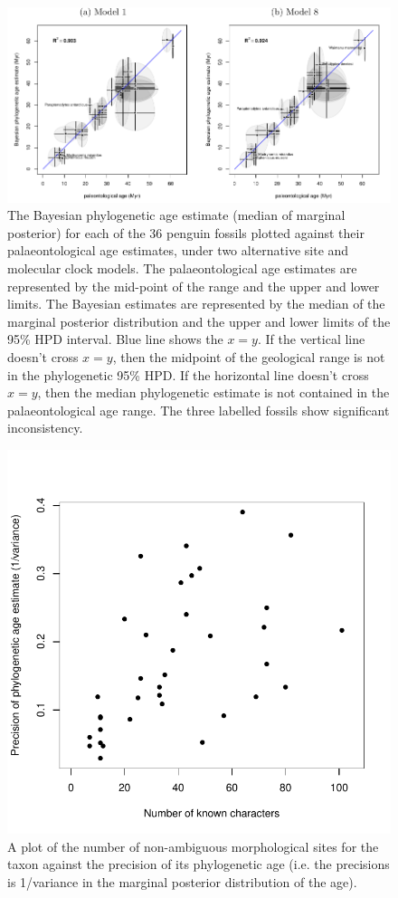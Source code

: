 \documentclass[11pt]{article}
\begin{document}
\begin{figure}
\includegraphics{Figure1.pdf}
\caption{\label{fig:phyloAgeVsGeoAge}
The Bayesian phylogenetic age estimate (median of marginal posterior) for each of the 36 penguin fossils plotted against their palaeontological age estimates, under two alternative site and molecular clock models. The palaeontological age estimates are represented by the mid-point of the range and the upper and lower limits. The Bayesian estimates are represented by the median of the marginal posterior distribution and the upper and lower limits of the 95\% HPD interval. Blue line shows the $x=y$. If the vertical line doesn't cross $x=y$, then the midpoint of the geological range is not in the phylogenetic 95\% HPD. If the horizontal line doesn't cross $x=y$, then the median phylogenetic estimate is not contained in the palaeontological age range. The three labelled fossils show significant inconsistency.}
\end{figure}

\begin{figure}
\includegraphics[width=5in]{run8_5/8_precisionVsKnownCharacters.pdf}
\caption{A plot of the number of non-ambiguous morphological sites for the taxon against the precision of its phylogenetic age (i.e. the precisions is 1/variance in the marginal posterior distribution of the age).}
\end{figure}
\end{document}
